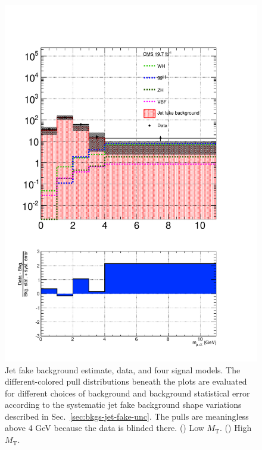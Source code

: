 \begin{figure}[hbtp]
\begin{center}
    \includegraphics[width=\cmsFigWidth]{figures/muHadMassCanvas_final_a9_highMT_v87}
    \caption{Jet fake background estimate, data, and four signal models.  The different-colored pull distributions beneath the plots are evaluated for different choices of background and background statistical error according to the systematic jet fake background shape variations described in Sec.~\ref{sec:bkgs-jet-fake-unc}.  The pulls are meaningless above 4 GeV because the data is blinded there.  (\cmsLeft) Low $M_{\text{T}}$.  (\cmsRight) High $M_{\text{T}}$.}
    \label{fig:final}
  \end{center}
\end{figure}

